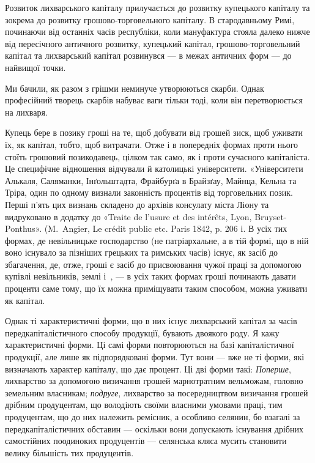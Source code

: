 
Розвиток лихварського капіталу прилучається до розвитку купецького капіталу
та зокрема до розвитку грошово-торговельного капіталу. В стародавньому
Римі, починаючи від останніх часів республіки, коли мануфактура стояла далеко
нижче від пересічного античного розвитку, купецький капітал, грошово-торговельний
капітал та лихварський капітал розвинувся — в межах античних форм —
до найвищої точки.

Ми бачили, як разом з грішми неминуче утворюються скарби. Однак професійний
творець скарбів набуває ваги тільки тоді, коли він перетворюється на
лихваря.

Купець бере в позику гроші на те, щоб добувати від грошей зиск, щоб уживати
їх, як капітал, тобто, щоб витрачати. Отже і в попередніх формах проти
нього стоїть грошовий позикодавець, цілком так само, як і проти сучасного капіталіста.
Це специфічне відношення відчували й католицькі університети. «Університети
Алькаля, Саляманки, Інґольштадта, Фрайбурґа в Брайзґау, Майнца, Кельна та
Тріра, один по одному визнали законність процентів від торговельних позик.
Перші п’ять цих визнань складено до архівів консулату міста Ліону та видруковано
в додатку до «Traite de l’usure et des intérêts, Lyon, Bruyset-Ponthus».
(M.~Angier, Le crédit public etc. Paris 1842, p. 206 і. В усіх тих формах, де невільницьке
господарство (не патріархальне, а в тій формі, що в ній воно існувало
за пізніших грецьких та римських часів) існує, як засіб до збагачення,
де, отже, гроші є засіб до присвоювання чужої праці за допомогою купівлі невільників,
землі і~, — в усіх таких формах гроші починають давати проценти
саме тому, що їх можна приміщувати таким способом, можна уживати
як капітал.

Однак ті характеристичні форми, що в них існує лихварський капітал за
часів передкапіталістичного способу продукції, бувають двоякого роду. Я кажу
характеристичні форми. Ці самі форми повторюються на базі капіталістичної
продукції, але лише як підпорядковані форми. Тут вони — вже не ті форми, які
визначають характер капіталу, що дає процент. Ці дві форми такі: \emph{Поперше},
лихварство за допомогою визичання грошей марнотратним вельможам, головно
земельним власникам; \emph{подруге}, лихварство за посередництвом визичання грошей
дрібним продуцентам, що володіють своїми власними умовами праці, тим продуцентам,
що до них належить ремісник, а особливо селянин, бо взагалі за передкапіталістичних
обставин — оскільки вони допускають існування дрібних самостійних
поодиноких продуцентів — селянська кляса мусить становити велику більшість
тих продуцентів.

